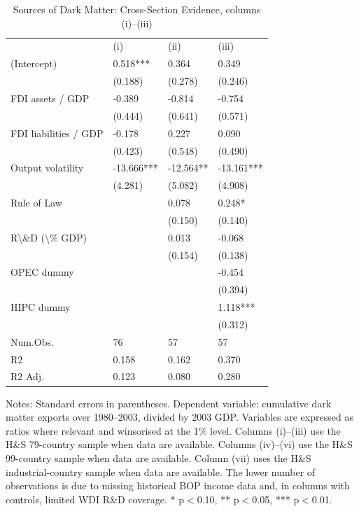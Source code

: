 \begin{table}[htbp]
\centering
\caption{Sources of Dark Matter: Cross-Section Evidence, columns (i)--(iii)}
\label{tab:table3a}
\scriptsize
\begin{tabular}{llll}
& (i) & (ii) & (iii) \\
(Intercept) & 0.518*** & 0.364 & 0.349 \\
& (0.188) & (0.278) & (0.246) \\
FDI assets / GDP & -0.389 & -0.814 & -0.754 \\
& (0.444) & (0.641) & (0.571) \\
FDI liabilities / GDP & -0.178 & 0.227 & 0.090 \\
& (0.423) & (0.548) & (0.490) \\
Output volatility & -13.666*** & -12.564** & -13.161*** \\
& (4.281) & (5.082) & (4.908) \\
Rule of Law &  & 0.078 & 0.248* \\
&  & (0.150) & (0.140) \\
R\textbackslash{}\&D (\textbackslash{}\% GDP) &  & 0.013 & -0.068 \\
&  & (0.154) & (0.138) \\
OPEC dummy &  &  & -0.454 \\
&  &  & (0.394) \\
HIPC dummy &  &  & 1.118*** \\
&  &  & (0.312) \\
Num.Obs. & 76 & 57 & 57 \\
R2 & 0.158 & 0.162 & 0.370 \\
R2 Adj. & 0.123 & 0.080 & 0.280 \\
\end{tabular}
\begin{minipage}{0.95\linewidth}
\footnotesize Notes: Standard errors in parentheses. Dependent variable: cumulative dark matter exports over 1980--2003, divided by 2003 GDP. Variables are expressed as ratios where relevant and winsorised at the 1\% level. Columns (i)--(iii) use the H\&S 79-country sample when data are available. Columns (iv)--(vi) use the H\&S 99-country sample when data are available. Column (vii) uses the H\&S industrial-country sample when data are available. The lower number of observations is due to missing historical BOP income data and, in columns with controls, limited WDI R\&D coverage. * p$<$0.10, ** p$<$0.05, *** p$<$0.01.
\end{minipage}
\end{table}
